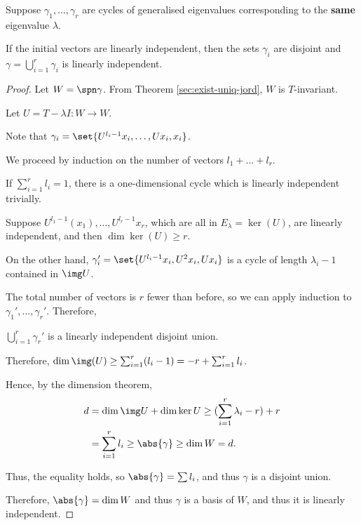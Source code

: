 \documentclass[11pt]{scrartcl}
\begin{document}
\begin{theorem}
  Suppose $\gamma_1,\dots, \gamma_r$ are cycles of generalised
  eigenvalues corresponding to the \textbf{same} eigenvalue $\lambda$.

  If the initial vectors are linearly independent, then the sets $\gamma_i$ are disjoint and $\gamma = \bigcup_{i=1}^r\gamma_i$ is linearly independent.
\end{theorem}
\begin{proof}
  \hfill

  Let $W=\spn \gamma$. From Theorem \ref{sec:exist-uniq-jord}, $W$ is $T$-invariant.

  Let $U = T-\lambda I:W\to W$.

  Note that $\gamma_i = \set{U^{l_i-1}x_i, \dots, Ux_i, x_i}$.

  We proceed by induction on the number of vectors
  $l_1+\dots+l_r$.

  If $\sum_{i=1}^rl_i = 1$, there is a one-dimensional cycle which is linearly independent trivially.

  Suppose $U^{l_1-1}(x_1), \dots, U^{l_r-1}x_r$, which are all in
  $E_{\lambda}= \ker (U)$, are linearly independent, and then
  $\dim \ker(U) \geq r$.

  On the other hand,
  $\gamma_i' = \set{U^{l_i-1}x_i, U^2x_i, Ux_i}$ is a cycle of length $\lambda_i-1$ contained in $\img U$.

  The total number of vectors is $r$ fewer than before, so we can
  apply induction to $\gamma_1', \dots, \gamma_r'$.  Therefore,

  $\bigcup_{i=1}^r\gamma_r'$ is a linearly independent disjoint union.

  Therefore,
  $\dim \img(U)\geq \sum_{i=1}^r(l_i-1) = -r + \sum_{i=1}^rl_{i}$.

  Hence, by the dimension theorem,
  \begin{align}
    d &= \dim \img U +\dim \ker U \geq (\sum_{i=1}^r\lambda_i -r)+r\\
      &= \sum_{i=1}^rl_i\geq \abs{\gamma} \geq \dim W = d.
  \end{align}

  Thus, the equality holds, so $\abs{\gamma} = \sum l_i$, and thus
  $\gamma$ is a disjoint union.

  Therefore, $\abs{\gamma} = \dim W$ and thus $\gamma$ is a basis of
  $W$, and thus it is linearly independent.
\end{proof}
\end{document}
